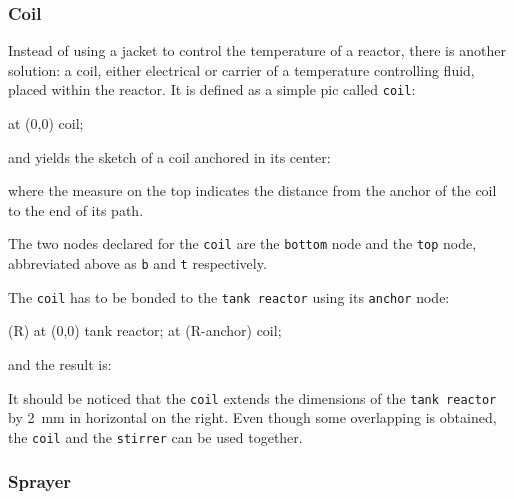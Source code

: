 \documentclass[12pt]{article}						%
\newcommand*{\chpn}[1]{\texttt{#1}}				%
\newcommand*{\chpp}[1]{\texttt{#1}}				%
\begin{document}
\subsubsection{Coil}

Instead of using a jacket to control the temperature of a reactor, there is
another solution: a coil, either electrical or carrier of a temperature
controlling fluid, placed within the reactor. It is defined as a simple pic
called \chpp{coil}:
\begin{chpcode}
	\pic at (0,0) {coil};
\end{chpcode}
and yields the sketch of a coil anchored in its center:
\begin{center}
\end{center}
where the measure on the top indicates the distance from the anchor of the coil
to the end of its path.

The two nodes declared for the \chpp{coil} are the \chpn{bottom} node and the
\chpn{top} node, abbreviated above as \chpn{b} and \chpn{t} respectively.

The \chpp{coil} has to be bonded to the \chpp{tank reactor} using its
\chpn{anchor} node:
\begin{chpcode}
	\pic (R) at (0,0) {tank reactor};
	\pic at (R-anchor) {coil};
\end{chpcode}
and the result is:
\begin{center}
\end{center}
It should be noticed that the \chpp{coil} extends the dimensions of the
\chpp{tank reactor} by \SI{2}{\mm} in horizontal on the right.
Even though some overlapping is obtained, the \chpp{coil} and the \chpp{stirrer}
can be used together.

\subsubsection{Sprayer}
\end{document}
